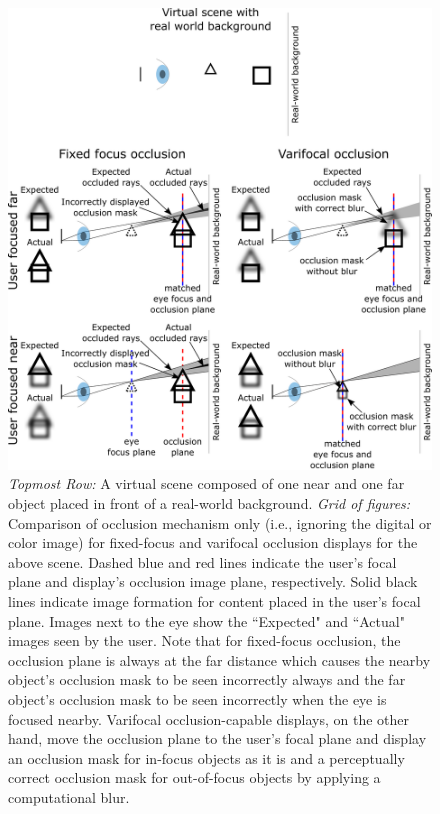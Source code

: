 \begin{figure}[htpb!]
\centering
\includegraphics[width=0.9\columnwidth]{images/varifocal_occlusion/depth-dependent-occlusion}
\caption[Varifocal-Occlusion NED: Introducing the concept of depth-dependent occlusion]{\emph{Topmost Row:} A virtual scene composed of one near and one far object placed in front of a real-world background. \emph{Grid of figures:} Comparison of occlusion mechanism only (i.e., ignoring the digital or color image) for fixed-focus and varifocal occlusion displays for the above scene. Dashed blue and red lines indicate the user's focal plane and display's occlusion image plane, respectively. Solid black lines indicate image formation for content placed in the user's focal plane. Images next to the eye show the ``Expected" and ``Actual" images seen by the user. Note that for fixed-focus occlusion, the occlusion plane is always at the far distance which causes the nearby object's occlusion mask to be seen incorrectly always and the far object's occlusion mask to be seen incorrectly when the eye is focused nearby. Varifocal occlusion-capable displays, on the other hand, move the occlusion plane to the user's focal plane and display an occlusion mask for in-focus objects as it is and a perceptually correct occlusion mask for out-of-focus objects by applying a computational blur.}
\label{fig:varifocal_occlusion:depth-dependent-occlusion}
\end{figure}
    
